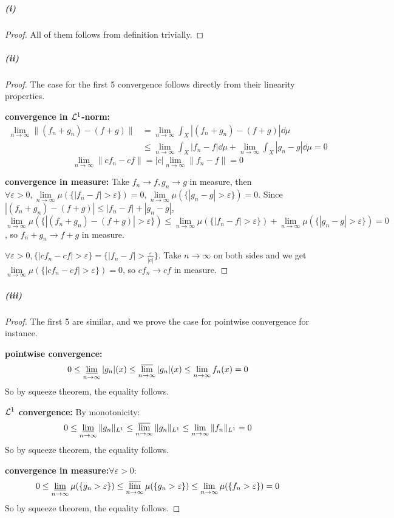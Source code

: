 \documentclass{article}
\begin{document}
\subparagraph{(i)}
\begin{proof}
All of them follows from definition trivially.
\end{proof}
\subparagraph{(ii)}
\begin{proof}
The case for the first 5 convergence follows directly from their linearity properties.

\textbf{convergence in $\mathcal{L}^1$-norm:} 
\[\begin{aligned}
\lim\limits_{n\to\infty}\|(f_n+g_n)-(f+g)\|&=\lim_{n\to\infty}\int_{X}|(f_n+g_n)-(f+g)|\dd\mu\\
&\leq\lim_{n\to\infty}\int_{X}|f_n-f|\dd\mu+\lim_{n\to\infty}\int_{X}|g_n-g|\dd\mu=0
\end{aligned}\]
\[\lim_{n\to\infty}\|cf_n-cf\|=|c|\lim_{n\to\infty}\|f_n-f\|=0\]

\textbf{convergence in measure:} Take $f_n\to f,g_n\to g$ in measure, then $\forall \varepsilon>0, \lim\limits_{n\to\infty}\mu(\{|f_n-f|>\varepsilon\})=0, \lim\limits_{n\to\infty}\mu(\{|g_n-g|>\varepsilon\})=0$. Since $|(f_n+g_n)-(f+g)|\leq |f_n-f|+|g_n-g|$, $\lim\limits_{n\to\infty}\mu(\{|(f_n+g_n)-(f+g)|>\varepsilon\})\leq \lim\limits_{n\to\infty}\mu(\{|f_n-f|>\varepsilon\})+\lim\limits_{n\to\infty}\mu(\{|g_n-g|>\varepsilon\})=0$, so $f_n+g_n\to f+g$ in measure. 

$\forall\varepsilon>0, \{|cf_n-cf|>\varepsilon\}=\{|f_n-f|>\frac{\varepsilon}{|c|}\}$. Take $n\to\infty$ on both sides and we get $\lim\limits_{n\to\infty}\mu(\{|cf_n-cf|>\varepsilon\})=0$, so $cf_n\to cf$ in measure.
\end{proof}
\subparagraph{(iii)}
\begin{proof}
The first 5 are similar, and we prove the case for pointwise convergence for instance.

\textbf{pointwise convergence:}
\[0\leq\varliminf\limits_{n\to\infty}|g_n|(x)\leq\varlimsup\limits_{n\to\infty}|g_n|(x)\leq\lim\limits_{n\to\infty}f_n(x)=0\]
So by squeeze theorem, the equality follows.

\textbf{$\mathcal{L}^1$ convergence:}
By monotonicity:
\[0\leq\varliminf\limits_{n\to\infty}\|g_n\|_{L^1}\leq\varlimsup\limits_{n\to\infty}\|g_n\|_{L^1}\leq\lim\limits_{n\to\infty}\|f_n\|_{L^1}=0\]
So by squeeze theorem, the equality follows.

\textbf{convergence in measure:}$\forall\varepsilon>0$:
\[0\leq\varliminf_{n\to\infty}\mu(\{g_n>\varepsilon\})\leq\varlimsup_{n\to\infty}\mu(\{g_n>\varepsilon\})\leq \lim_{n\to\infty}\mu(\{f_n>\varepsilon\})=0\]
So by squeeze theorem, the equality follows.
\end{proof}
\end{document}
